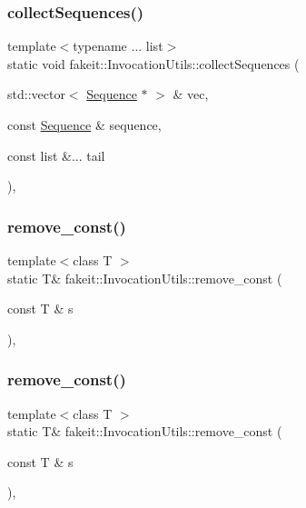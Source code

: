 \subsubsection{\texorpdfstring{collectSequences()}{collectSequences()}\hspace{0.1cm}{\footnotesize\ttfamily [18/18]}}
{\footnotesize\ttfamily template$<$typename ... list$>$ \\
static void fakeit\+::\+Invocation\+Utils\+::collect\+Sequences (\begin{DoxyParamCaption}\item[{std\+::vector$<$ \mbox{\hyperlink{classfakeit_1_1Sequence}{Sequence}} $\ast$ $>$ \&}]{vec,  }\item[{const \mbox{\hyperlink{classfakeit_1_1Sequence}{Sequence}} \&}]{sequence,  }\item[{const list \&...}]{tail }\end{DoxyParamCaption})\hspace{0.3cm}{\ttfamily [inline]}, {\ttfamily [static]}}

\mbox{\label{structfakeit_1_1InvocationUtils_ad92724e2654997a1db229644d7f2ada9}} 
\subsubsection{\texorpdfstring{remove\_const()}{remove\_const()}\hspace{0.1cm}{\footnotesize\ttfamily [1/9]}}
{\footnotesize\ttfamily template$<$class T $>$ \\
static T\& fakeit\+::\+Invocation\+Utils\+::remove\+\_\+const (\begin{DoxyParamCaption}\item[{const T \&}]{s }\end{DoxyParamCaption})\hspace{0.3cm}{\ttfamily [inline]}, {\ttfamily [static]}}

\mbox{\label{structfakeit_1_1InvocationUtils_ad92724e2654997a1db229644d7f2ada9}} 
\subsubsection{\texorpdfstring{remove\_const()}{remove\_const()}\hspace{0.1cm}{\footnotesize\ttfamily [2/9]}}
{\footnotesize\ttfamily template$<$class T $>$ \\
static T\& fakeit\+::\+Invocation\+Utils\+::remove\+\_\+const (\begin{DoxyParamCaption}\item[{const T \&}]{s }\end{DoxyParamCaption})\hspace{0.3cm}{\ttfamily [inline]}, {\ttfamily [static]}}

